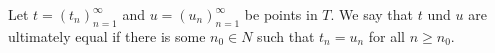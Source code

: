 Let $t = (t_n)_{n=1}^{\infty}$ and $u = (u_n)_{n=1}^{\infty}$ be points in $T$. We say that $t$ und $u$ are ultimately equal if there is some $n_0 \in N$ such that $t_n = u_n$ for all $n \geq n_0$.